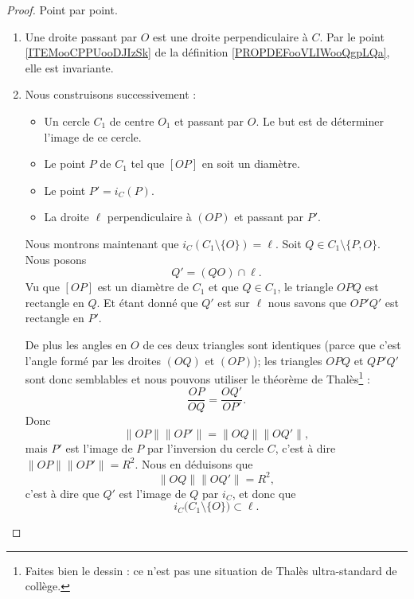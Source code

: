 \begin{proof}
    Point par point.
    \begin{enumerate}
        \item
            Une droite passant par \( O\) est une droite perpendiculaire à \( C\). Par le point \ref{ITEMooCPPUooDJIzSk} de la définition \ref{PROPDEFooVLIWooQgpLQa}, elle est invariante.
        \item
            Nous construisons successivement :
            \begin{itemize}
                \item 
                    Un cercle \( C_1\) de centre \( O_1\) et passant par \( O\). Le but est de déterminer l'image de ce cercle.
                \item
                    Le point \( P\) de \( C_1\) tel que \( [OP]\) en soit un diamètre.
                \item
                    Le point \( P'=i_C(P)\).
                \item
                    La droite \( \ell\) perpendiculaire à \( (OP)\) et passant par \( P'\).
            \end{itemize}
            Nous montrons maintenant que \( i_C(C_1\setminus\{ O \})=\ell\). Soit \( Q\in C_1\setminus\{ P,O \}\). Nous posons
            \begin{equation}
                Q'=(QO)\cap \ell.
            \end{equation}
            Vu que \( [OP]\) est un diamètre de \( C_1\) et que \( Q\in C_1\), le triangle \( OPQ\) est rectangle en \( Q\). Et étant donné que \( Q'\) est sur \( \ell\) nous savons que \( OP'Q'\) est rectangle en \( P'\).
            
            De plus les angles en \( O\) de ces deux triangles sont identiques (parce que c'est l'angle formé par les droites \( (OQ) \) et \( (OP)\)); les triangles \( OPQ\) et \( QP'Q'\) sont donc semblables et nous pouvons utiliser le théorème de Thalès\footnote{Faites bien le dessin : ce n'est pas une situation de Thalès ultra-standard de collège.} :
            \begin{equation}
                \frac{ OP }{ OQ }=\frac{ OQ' }{ OP' }.
            \end{equation}
            Donc
            \begin{equation}
                \| OP \|\| OP' \|=\| OQ \|\| OQ' \|,
            \end{equation}
            mais \( P'\) est l'image de \( P\) par l'inversion du cercle \( C\), c'est à dire \( \| OP \|\| OP' \|=R^2\). Nous en déduisons que
            \begin{equation}
                \| OQ \| \| OQ' \|=R^2,
            \end{equation}
            c'est à dire que \( Q'\) est l'image de \( Q\) par \( i_C\), et donc que
            \begin{equation}        \label{EQooPJBGooGeIVQQ}
                i_C\big( C_1\setminus\{ O \} \big)\subset \ell.
            \end{equation}
            

\end{enumerate}
\end{proof}
